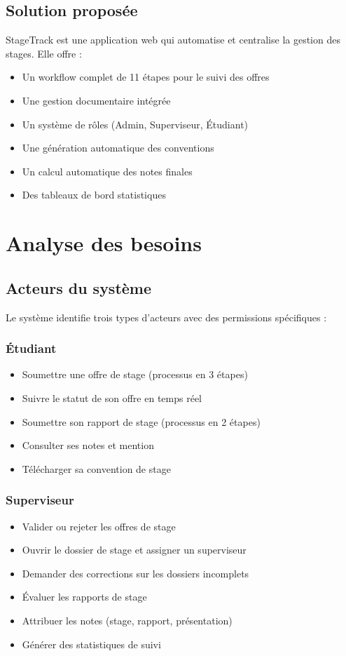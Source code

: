 \documentclass[12pt,a4paper]{report}
\begin{document}
\section{Solution proposée}
StageTrack est une application web qui automatise et centralise la gestion des stages. Elle offre :
\begin{itemize}
    \item Un workflow complet de 11 étapes pour le suivi des offres
    \item Une gestion documentaire intégrée
    \item Un système de rôles (Admin, Superviseur, Étudiant)
    \item Une génération automatique des conventions
    \item Un calcul automatique des notes finales
    \item Des tableaux de bord statistiques
\end{itemize}

\chapter{Analyse des besoins}

\section{Acteurs du système}
Le système identifie trois types d'acteurs avec des permissions spécifiques :

\subsection{Étudiant}
\begin{itemize}
    \item Soumettre une offre de stage (processus en 3 étapes)
    \item Suivre le statut de son offre en temps réel
    \item Soumettre son rapport de stage (processus en 2 étapes)
    \item Consulter ses notes et mention
    \item Télécharger sa convention de stage
\end{itemize}

\subsection{Superviseur}
\begin{itemize}
    \item Valider ou rejeter les offres de stage
    \item Ouvrir le dossier de stage et assigner un superviseur
    \item Demander des corrections sur les dossiers incomplets
    \item Évaluer les rapports de stage
    \item Attribuer les notes (stage, rapport, présentation)
    \item Générer des statistiques de suivi
\end{itemize}
\end{document}

